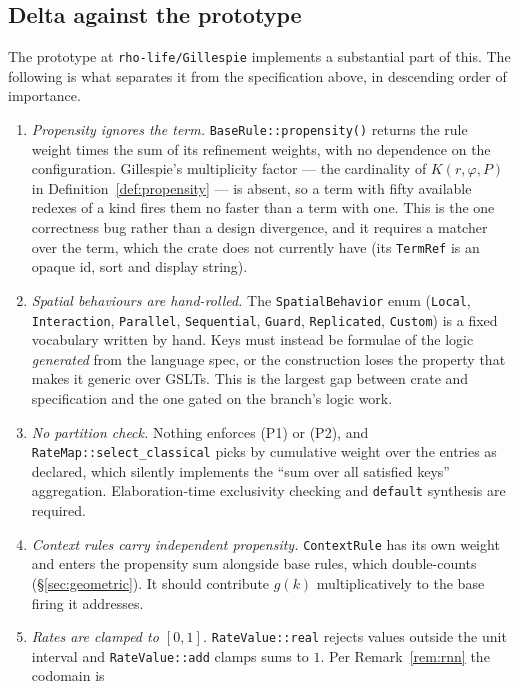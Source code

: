 \documentclass[11pt,a4paper]{article}
\theoremstyle{plain}
\theoremstyle{definition}
\theoremstyle{remark}
\newcommand{\gfac}{g}
\begin{document}
\subsection{Delta against the prototype}

The prototype at \texttt{rho-life/Gillespie} \cite{gillespie-crate} implements a substantial part of
this. The following is what separates it from the specification above, in descending order of
importance.

\begin{enumerate}[leftmargin=2.2em]
\item \emph{Propensity ignores the term.} \texttt{BaseRule::propensity()} returns the rule weight
times the sum of its refinement weights, with no dependence on the configuration. Gillespie's multiplicity factor --- the cardinality of $K(r,\varphi,P)$ in
Definition~\ref{def:propensity} --- is absent, so a term with fifty available redexes of a kind fires
them no faster than a term with one. This is the one correctness bug rather than a design
divergence, and it requires a matcher over the term, which the crate does not currently have (its
\texttt{TermRef} is an opaque id, sort and display string).
\item \emph{Spatial behaviours are hand-rolled.} The \texttt{SpatialBehavior} enum
(\texttt{Local}, \texttt{Interaction}, \texttt{Parallel}, \texttt{Sequential}, \texttt{Guard},
\texttt{Replicated}, \texttt{Custom}) is a fixed vocabulary written by hand. Keys must instead be
formulae of the logic \emph{generated} from the language spec, or the construction loses the property
that makes it generic over GSLTs. This is the largest gap between crate and specification and the
one gated on the branch's logic work.
\item \emph{No partition check.} Nothing enforces (P1) or (P2), and \texttt{RateMap::select\_classical}
picks by cumulative weight over the entries as declared, which silently implements the
``sum over all satisfied keys'' aggregation. Elaboration-time exclusivity checking and
\texttt{default} synthesis are required.
\item \emph{Context rules carry independent propensity.} \texttt{ContextRule} has its own weight and
enters the propensity sum alongside base rules, which double-counts (\S\ref{sec:geometric}). It
should contribute $\gfac(k)$ multiplicatively to the base firing it addresses.
\item \emph{Rates are clamped to $[0,1]$.} \texttt{RateValue::real} rejects values outside the unit
interval and \texttt{RateValue::add} clamps sums to $1$. Per Remark~\ref{rem:rnn} the codomain is

\end{enumerate}
\end{document}
